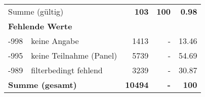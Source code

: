 \begin{longtable}{lXrrr}
     \midrule
     \multicolumn{2}{l}{Summe (gültig)} &
       \textbf{\num{103}} &
     \textbf{\num{100}} &
       \textbf{\num[round-mode=places,round-precision=2]{0.98}} \\
     \multicolumn{5}{l}{\textbf{Fehlende Werte}}\\
       -998 &
       keine Angabe &
         \num{1413} &
        - &
         \num[round-mode=places,round-precision=2]{13.46} \\
       -995 &
       keine Teilnahme (Panel) &
         \num{5739} &
        - &
         \num[round-mode=places,round-precision=2]{54.69} \\
       -989 &
       filterbedingt fehlend &
         \num{3239} &
        - &
         \num[round-mode=places,round-precision=2]{30.87} \\
     \midrule
     \multicolumn{2}{l}{\textbf{Summe (gesamt)}} &
          \textbf{\num{10494}} &
        \textbf{-} &
        \textbf{\num{100}} \\
     \bottomrule
     \end{longtable}
     
